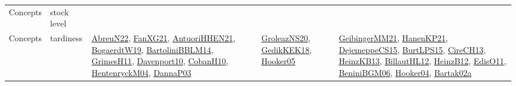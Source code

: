 {\begin{longtable}{lp{3cm}>{\raggedright}p{6cm}>{\raggedright}p{6cm}p{8cm}}
Concepts & stock level &  &  & \\
Concepts & tardiness & \href{articles/AbreuN22.pdf}{AbreuN22}\cite{AbreuN22}, \href{articles/FanXG21.pdf}{FanXG21}\cite{FanXG21}, \href{papers/AntuoriHHEN21.pdf}{AntuoriHHEN21}\cite{AntuoriHHEN21}, \href{papers/BogaerdtW19.pdf}{BogaerdtW19}\cite{BogaerdtW19}, \href{papers/BartoliniBBLM14.pdf}{BartoliniBBLM14}\cite{BartoliniBBLM14}, \href{papers/GrimesH11.pdf}{GrimesH11}\cite{GrimesH11}, \href{papers/Davenport10.pdf}{Davenport10}\cite{Davenport10}, \href{papers/CobanH10.pdf}{CobanH10}\cite{CobanH10}, \href{papers/HentenryckM04.pdf}{HentenryckM04}\cite{HentenryckM04}, \href{papers/DannaP03.pdf}{DannaP03}\cite{DannaP03} & \href{papers/GroleazNS20.pdf}{GroleazNS20}\cite{GroleazNS20}, \href{articles/GedikKEK18.pdf}{GedikKEK18}\cite{GedikKEK18}, \href{articles/Hooker05.pdf}{Hooker05}\cite{Hooker05} & \href{papers/GeibingerMM21.pdf}{GeibingerMM21}\cite{GeibingerMM21}, \href{papers/HanenKP21.pdf}{HanenKP21}\cite{HanenKP21}, \href{papers/DejemeppeCS15.pdf}{DejemeppeCS15}\cite{DejemeppeCS15}, \href{papers/BurtLPS15.pdf}{BurtLPS15}\cite{BurtLPS15}, \href{papers/CireCH13.pdf}{CireCH13}\cite{CireCH13}, \href{papers/HeinzKB13.pdf}{HeinzKB13}\cite{HeinzKB13}, \href{papers/BillautHL12.pdf}{BillautHL12}\cite{BillautHL12}, \href{papers/HeinzB12.pdf}{HeinzB12}\cite{HeinzB12}, \href{papers/EdisO11.pdf}{EdisO11}\cite{EdisO11}, \href{papers/BeniniBGM06.pdf}{BeniniBGM06}\cite{BeniniBGM06}, \href{papers/Hooker04.pdf}{Hooker04}\cite{Hooker04}, \href{papers/Bartak02a.pdf}{Bartak02a}\cite{Bartak02a}\\

\end{longtable}}
